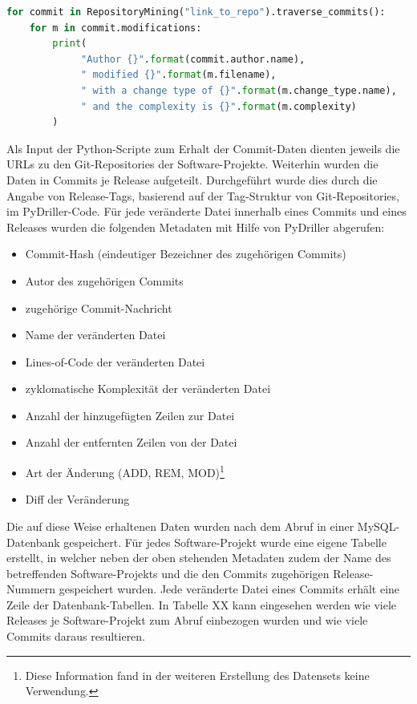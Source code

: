 \begin{lstlisting}[language=Python, caption=Beispielhafter PyDriller-Code zur Ausgabe von Metadaten von Commits, frame=single]
for commit in RepositoryMining("link_to_repo").traverse_commits(): 
	for m in commit.modifications: 
		print( 
		     "Author {}".format(commit.author.name), 
		     " modified {}".format(m.filename), 
		     " with a change type of {}".format(m.change_type.name), 
		     " and the complexity is {}".format(m.complexity) 
		)
\end{lstlisting}

Als Input der Python-Scripte zum Erhalt der Commit-Daten dienten jeweils die URLs zu den Git-Repositories der Software-Projekte. Weiterhin wurden die Daten in Commits je Release aufgeteilt. Durchgeführt wurde dies durch die Angabe von Release-Tags, basierend auf der Tag-Struktur von Git-Repositories, im PyDriller-Code. Für jede veränderte Datei innerhalb eines Commits und eines Releases wurden die folgenden Metadaten mit Hilfe von PyDriller abgerufen:

\begin{multicols}{2}
\begin{itemize}
\item Commit-Hash (eindeutiger Bezeichner des zugehörigen Commits)
\item Autor des zugehörigen Commits
\item zugehörige Commit-Nachricht
\item Name der veränderten Datei
\item Lines-of-Code der veränderten Datei
\item zyklomatische Komplexität der veränderten Datei
\item Anzahl der hinzugefügten Zeilen zur Datei
\item Anzahl der entfernten Zeilen von der Datei
\item Art der Änderung (ADD, REM, MOD)\footnote{Diese Information fand in der weiteren Erstellung des Datensets keine Verwendung.}
\item Diff der Veränderung
\end{itemize}
\end{multicols}

Die auf diese Weise erhaltenen Daten wurden nach dem Abruf in einer MySQL-Datenbank gespeichert. Für jedes Software-Projekt wurde eine eigene Tabelle erstellt, in welcher neben der oben stehenden Metadaten zudem der Name des betreffenden Software-Projekts und die den Commits zugehörigen Release-Nummern gespeichert wurden. Jede veränderte Datei eines Commits erhält eine Zeile der Datenbank-Tabellen. In Tabelle XX kann eingesehen werden wie viele Releases je Software-Projekt zum Abruf einbezogen wurden und wie viele Commits daraus resultieren.

